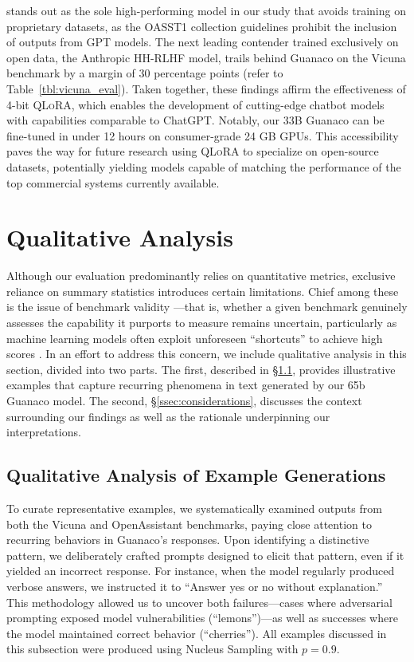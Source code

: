  stands out as the sole high-performing model in our study that avoids training on proprietary datasets, as the OASST1 collection guidelines prohibit the inclusion of outputs from GPT models. The next leading contender trained exclusively on open data, the Anthropic HH-RLHF model, trails behind {Guanaco} on the Vicuna benchmark by a margin of 30 percentage points (refer to Table~\ref{tbl:vicuna_eval}). Taken together, these findings affirm the effectiveness of 4-bit \textsc{QLoRA}, which enables the development of cutting-edge chatbot models with capabilities comparable to ChatGPT. Notably, our 33B {Guanaco} can be fine-tuned in under 12 hours on consumer-grade 24 GB GPUs. This accessibility paves the way for future research using \textsc{QLoRA} to specialize on open-source datasets, potentially yielding models capable of matching the performance of the top commercial systems currently available.

\section{Qualitative Analysis}

Although our evaluation predominantly relies on quantitative metrics, exclusive reliance on summary statistics introduces certain limitations. Chief among these is the issue of benchmark validity \citep{liao2021we}—that is, whether a given benchmark genuinely assesses the capability it purports to measure remains uncertain, particularly as machine learning models often exploit unforeseen ``shortcuts'' to achieve high scores \citep{gururangan2018annotation, poliak2018hypothesis}. In an effort to address this concern, we include qualitative analysis in this section, divided into two parts. The first, described in \S\ref{ssec:examples}, provides illustrative examples that capture recurring phenomena in text generated by our 65b {Guanaco} model. The second, \S\ref{ssec:considerations}, discusses the context surrounding our findings as well as the rationale underpinning our interpretations.

\subsection{Qualitative Analysis of Example Generations}
\label{ssec:examples}

To curate representative examples, we systematically examined outputs from both the Vicuna and OpenAssistant benchmarks, paying close attention to recurring behaviors in {Guanaco}'s responses. Upon identifying a distinctive pattern, we deliberately crafted prompts designed to elicit that pattern, even if it yielded an incorrect response. For instance, when the model regularly produced verbose answers, we instructed it to ``Answer yes or no without explanation.'' This methodology allowed us to uncover both failures—cases where adversarial prompting exposed model vulnerabilities (“lemons”)—as well as successes where the model maintained correct behavior (“cherries”). All examples discussed in this subsection were produced using Nucleus Sampling \cite{holtzmancurious} with $p=0.9$.

